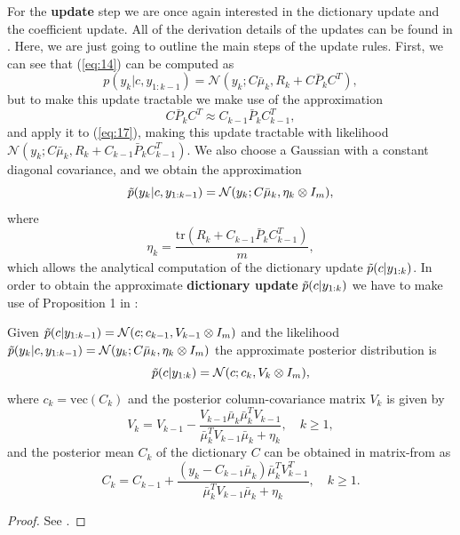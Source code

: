 \documentclass{mldsmsc}
\begin{document}
\noindent For the \textbf{update} step we are once again interested in the dictionary update and the coefficient update. All of the derivation details of the updates can be found in \cite{akyildiz2021probabilistic}. Here, we are just going to outline the main steps of the update rules. First, we can see that (\ref{eq:14}) can be computed as
\begin{equation} \label{eq:17}
    p(y_k | c, y_{1:k-1}) = \mathcal{N}(y_k; C \bar{\mu}_k, R_k + C \bar{P}_k C^T),
\end{equation}
but to make this update tractable we make use of the approximation
\begin{equation}
    C \bar{P}_k C^T \approx C_{k-1} \bar{P}_k C^T_{k-1},
\end{equation}
and apply it to (\ref{eq:17}), making this update tractable with likelihood $\mathcal{N}(y_k; C \bar{\mu}_k, R_k + C_{k-1} \bar{P}_k C_{k-1}^T)$. We also choose a Gaussian with a constant diagonal covariance, and we obtain the approximation
\begin{equation}\label{eq:18}
    \Tilde{p}(y_k | c, y_{1:k-1}) = \mathcal{N}(y_k; C \bar{\mu}_k, \eta_k \otimes I_m),
\end{equation}
where 
\begin{equation}
    \eta_k = \frac{\text{tr}(R_k + C_{k-1} \bar{P}_{k} C_{k-1}^{T})}{m},
\end{equation}
which allows the analytical computation of the dictionary update $\Tilde{p}(c | y_{1:k})$. In order to obtain the approximate \textbf{dictionary update} $\Tilde{p}(c | y_{1:k})$ we have to make use of Proposition 1 in \cite{akyildiz2021probabilistic}:
\begin{proposition}\label{prop:1}
    Given $\Tilde{p}(c | y_{1:k-1}) = \mathcal{N}(c; c_{k-1}, V_{k-1} \otimes I_m)$ and the likelihood $\Tilde{p}(y_k | c, y_{1:k-1}) = \mathcal{N}(y_k; C \bar{\mu}_k, \eta_k \otimes I_m)$ the approximate posterior distribution is
    \begin{equation}
        \Tilde{p}(c | y_{1:k}) = \mathcal{N}(c; c_k, V_k \otimes I_m),
    \end{equation}
    where $c_k = \text{vec}(C_k)$ and the posterior column-covariance matrix $V_k$ is given by
    \begin{equation}\label{eq:19}
        V_k = V_{k-1} - \frac{V_{k-1} \bar{\mu}_k \bar{\mu}^T_k V_{k-1}}{\bar{\mu}_k^T V_{k-1} \bar{\mu}_k + \eta_k}, \quad k \geq 1,
    \end{equation}
    and the posterior mean $C_k$ of the dictionary $C$ can be obtained in matrix-from as
    \begin{equation}
        C_k = C_{k-1} + \frac{(y_k - C_{k-1}\bar{\mu}_k)\bar{\mu}_k^T V_{k-1}^T}{\bar{\mu}_k^T V_{k-1} \bar{\mu}_k + \eta_k}, \quad k \geq 1.
    \end{equation}
\end{proposition}
\begin{proof}
    See \cite{akyildiz2021probabilistic}.
\end{proof}\newline
\end{document}
